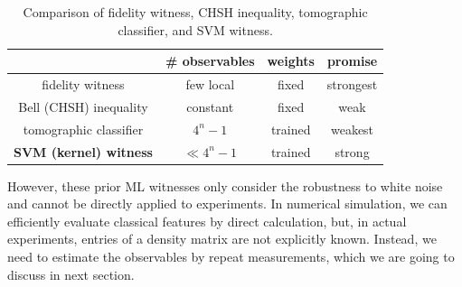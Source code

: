 \documentclass[
aps,
pra,
twocolumn,
floatfix,
]{revtex4-2}
\theoremstyle{plain}
\theoremstyle{definition}
\begin{document}

\begin{table}[!ht]
	\centering
	\begin{tabular}{c|c|c|c}
		& \# observables & weights & promise \\
		\hline
		fidelity  witness & few local & fixed & strongest  \\  
		Bell (CHSH) inequality & constant & fixed & weak \\  
		tomographic classifier & $4^n-1$ & trained & weakest \\  
		\textbf{SVM (kernel) witness} &  $\ll 4^n-1$ & trained & strong \\  
		\hline
	\end{tabular}
	\caption{Comparison of fidelity witness, CHSH inequality, tomographic classifier, and SVM witness.}
\end{table}

However, these prior ML witnesses only consider the robustness to white noise and cannot be directly applied to experiments.
In numerical simulation, we can efficiently evaluate classical features by direct calculation, 
but, in actual experiments, entries of a density matrix are not explicitly known.
Instead, we need to estimate the observables by repeat measurements, which we are going to discuss in next section.


\end{document}
